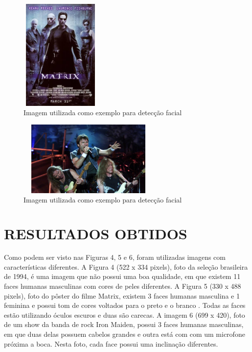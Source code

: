 \documentclass[conference]{IEEEtran}
\begin{document}
	    \begin{figure}[h!b]
			\centering \includegraphics[width=4cm,height=5.5cm]{matrix.jpg}
			\caption{Imagem utilizada como exemplo para detecção facial \cite{b6}} 
		\end{figure}

         \begin{figure}[h]
			\centering \includegraphics[width=7cm,height=3.7cm]{iron.jpg}
			\caption{Imagem utilizada como exemplo para detecção facial \cite{b7}} 
		\end{figure}

\bigskip
\bigskip
\bigskip

	\section{RESULTADOS OBTIDOS}
        Como podem ser visto nas Figuras 4, 5 e 6, foram utilizadas imagens com características diferentes. A Figura 4 (522 x 334 pixels), foto da seleção brasileira de 1994, é uma imagem que não possui uma boa qualidade, em que existem 11 faces humanas masculinas com cores de peles diferentes. A Figura 5 (330 x 488 pixels), foto do pôster do filme Matrix, existem 3 faces humanas masculina e 1 feminina e possui tom de cores voltados para o preto e o branco . Todas as faces estão utilizando óculos escuros e duas são carecas. A imagem 6 (699 x 420), foto de um show da banda de rock Iron Maiden, possui 3 faces humanas masculinas, em que duas delas possuem cabelos grandes e outra está com com um microfone próxima a boca. Nesta foto, cada face possui uma inclinação diferentes. 
        
\end{document}
